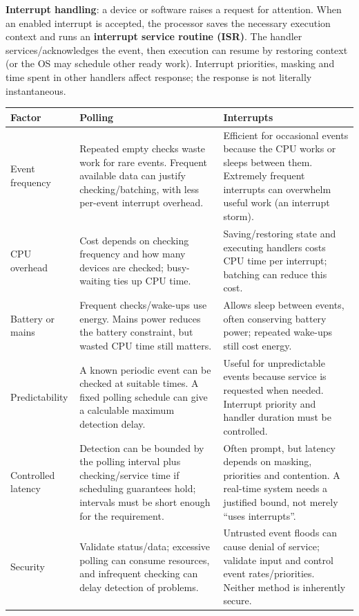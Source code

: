 \documentclass[a4paper,12pt]{article}
\begin{document}
\textbf{Interrupt handling}: a device or software raises a request for attention. When an enabled interrupt is accepted, the processor saves the necessary execution context and runs an \textbf{interrupt service routine (ISR)}. The handler services/acknowledges the event, then execution can resume by restoring context (or the OS may schedule other ready work). Interrupt priorities, masking and time spent in other handlers affect response; the response is not literally instantaneous.
\begin{center}
\begin{tabularx}{0.98\linewidth}{p{2.8cm} X X}
\toprule
\textbf{Factor} & \textbf{Polling} & \textbf{Interrupts} \\
\midrule
Event frequency & Repeated empty checks waste work for rare events. Frequent available data can justify checking/batching, with less per-event interrupt overhead. & Efficient for occasional events because the CPU works or sleeps between them. Extremely frequent interrupts can overwhelm useful work (an interrupt storm). \\
CPU overhead & Cost depends on checking frequency and how many devices are checked; busy-waiting ties up CPU time. & Saving/restoring state and executing handlers costs CPU time per interrupt; batching can reduce this cost. \\
Battery or mains & Frequent checks/wake-ups use energy. Mains power reduces the battery constraint, but wasted CPU time still matters. & Allows sleep between events, often conserving battery power; repeated wake-ups still cost energy. \\
Predictability & A known periodic event can be checked at suitable times. A fixed polling schedule can give a calculable maximum detection delay. & Useful for unpredictable events because service is requested when needed. Interrupt priority and handler duration must be controlled. \\
Controlled latency & Detection can be bounded by the polling interval plus checking/service time if scheduling guarantees hold; intervals must be short enough for the requirement. & Often prompt, but latency depends on masking, priorities and contention. A real-time system needs a justified bound, not merely ``uses interrupts''. \\
Security & Validate status/data; excessive polling can consume resources, and infrequent checking can delay detection of problems. & Untrusted event floods can cause denial of service; validate input and control event rates/priorities. Neither method is inherently secure. \\
\bottomrule
\end{tabularx}
\end{center}
\end{document}
